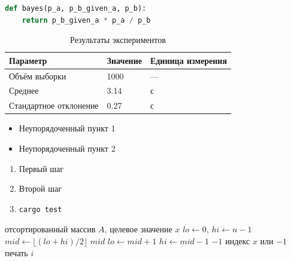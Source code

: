 \documentclass[14pt,a4paper]{extarticle}
\begin{document}
\clearpage



\begin{lstlisting}[language=Python, caption={Вычисление по формуле Байеса}, label=lst.formula]
def bayes(p_a, p_b_given_a, p_b):
    return p_b_given_a * p_a / p_b
\end{lstlisting}

\clearpage

\begin{table}[h]
\centering
\caption{Результаты экспериментов}\label{tbl.results}
\begin{tabular}{l | l | l}
\hline
Параметр & Значение & Единица измерения \\
\hline
Объём выборки & 1000 & — \\
Среднее & 3.14 & с \\
Стандартное отклонение & 0.27 & с \\
\hline
\end{tabular}
\end{table}

\begin{itemize}
  \item Неупорядоченный пункт 1
  \item Неупорядоченный пункт 2
\end{itemize}

\begin{enumerate}
  \item Первый шаг
  \item Второй шаг
  \item
\begin{lstlisting}[language=Bash, caption={Вложенный листинг}, label=lst.nested]
cargo test
\end{lstlisting}

\end{enumerate}

\begin{algorithm}
\caption{Двоичный поиск}\label{alg.search}
\begin{algorithmic}[1]
  \Require отсортированный массив $A$, целевое значение $x$
  \State $lo \gets 0$, $hi \gets n-1$
    \State $mid \gets \lfloor(lo+hi)/2\rfloor$
      \State \Return $mid$
    \Else
        \State $lo \gets mid + 1$
      \Else
        \State $hi \gets mid - 1$
      \EndIf
    \EndIf
  \EndWhile
  \State \Return $-1$
  \Ensure индекс $x$ или $-1$
    \State печать $i$
  \EndFor
\end{algorithmic}
\end{algorithm}
\end{document}
